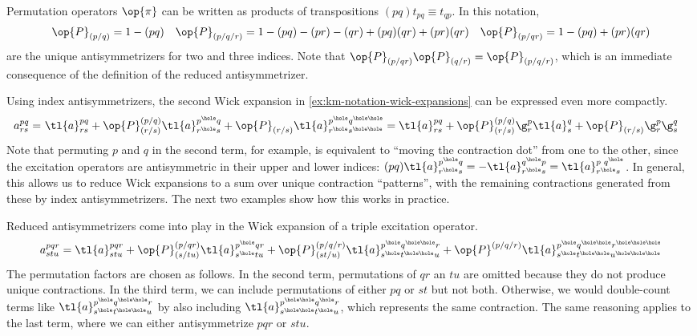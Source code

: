 \begin{ex}
Permutation operators $\op{\pi}$ can be written as products of transpositions $(pq)t_{pq}\equiv t_{qp}$.
In this notation,
\begin{align*}
  \op{P}_{(p/q)}
=
  1
-
  (pq)
&&
  \op{P}_{(p/q/r)}
=
  1
-
  (pq)
-
  (pr)
-
  (qr)
+
  (pq)(qr)
+
  (pr)(qr)
&&
  \op{P}_{(p/qr)}
=
  1
-
  (pq)
+
  (pr)(qr)
\end{align*}
are the unique antisymmetrizers for two and three indices.
Note that $\op{P}_{(p/qr)}\op{P}_{(q/r)}=\op{P}_{(p/q/r)}$, which is an immediate consequence of the definition of the reduced antisymmetrizer.
\end{ex}

\begin{ex}
Using index antisymmetrizers, the second Wick expansion in \cref{ex:km-notation-wick-expansions} can be expressed even more compactly.
\begin{align*}
  a^{pq}_{rs}
=&\
  \tl{a}^{pq}_{rs}
+
  \op{P}^{(p/q)}_{(r/s)}
  \tl{a}^{p^\hole q}_{r^\hole s}
+
  \op{P}_{(r/s)}
  \tl{a}^{p^\hole q^{\hole\hole}}_{r^\hole s^{\hole\hole}}
=
  \tl{a}^{pq}_{rs}
+
  \op{P}^{(p/q)}_{(r/s)}
  \g^p_r
  \tl{a}^{q}_{s}
+
  \op{P}_{(r/s)}
  \g^p_r
  \g^q_s
\end{align*}
Note that permuting $p$ and $q$ in the second term, for example, is equivalent to ``moving the contraction dot'' from one to the other, since the excitation operators are antisymmetric in their upper and lower indices:
$
  (pq)
  \tl{a}^{p^\hole q}_{r^\hole s}
=
-
  \tl{a}^{q^\hole p}_{r^\hole s}
=
  \tl{a}^{p\,\, q^\hole}_{r^\hole s}
$.
In general, this allows us to reduce Wick expansions to a sum over unique contraction ``patterns'', with the remaining contractions generated from these by index antisymmetrizers.
The next two examples show how this works in practice.
\end{ex}

\begin{ex}
Reduced antisymmetrizers come into play in the Wick expansion of a triple excitation operator.
\begin{align}
  a^{pqr}_{stu}
=
  \tl{a}^{pqr}_{stu}
+
  \op{P}^{(p/qr)}_{(s/tu)}
  \tl{a}^{p^\hole qr}_{s^\hole tu}
+
  \op{P}^{(p/q/r)}_{(st/u)}
  \tl{a}^{p^\hole q^{\hole\hole} r}_{s^\hole t^{\hole\hole} u}
+
  \op{P}^{(p/q/r)}
  \tl{a}^{p^\hole q^{\hole\hole} r^{\hole\hole\hole}}
        _{s^\hole t^{\hole\hole} u^{\hole\hole\hole}}
\end{align}
The permutation factors are chosen as follows.
In the second term, permutations of $qr$ an $tu$ are omitted because they do not produce unique contractions.
In the third term, we can include permutations of either $pq$ or $st$ but not both.
Otherwise, we would double-count terms like
$
  \tl{a}^{p^\hole q^{\hole\hole} r}_{s^\hole t^{\hole\hole} u}
$
by also including
$
  \tl{a}^{p^{\hole\hole} q^\hole r}_{s^{\hole\hole} t^\hole u}
$,
which represents the same contraction.
The same reasoning applies to the last term, where we can either antisymmetrize $pqr$ or $stu$.
\end{ex}



